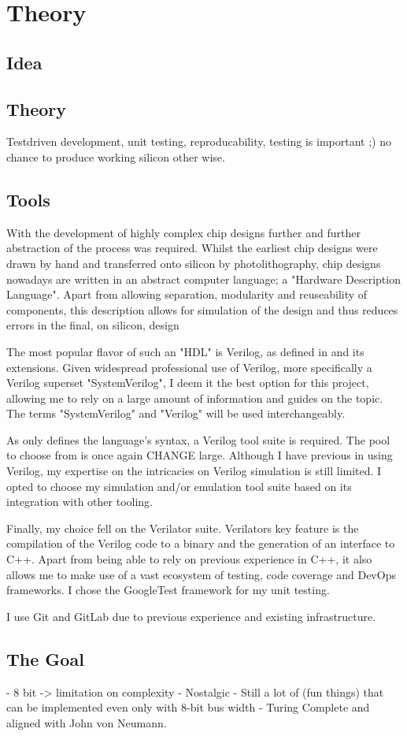 

\chapter{Theory}

\section{Idea}

\section{Theory}

Testdriven development, unit testing, reproducability, testing is important ;) no chance to produce working silicon other wise.

\section{Tools}
With the development of highly complex chip designs further and further abstraction of the process was required. Whilst the earliest chip designs were drawn by hand and transferred onto silicon by photolithography, chip designs nowadays are written in an abstract computer language; a "Hardware Description Language". Apart from allowing separation, modularity and reuseability of components, this description allows for simulation of the design and thus reduces errors in the final, on silicon, design 

The most popular flavor of such an "HDL" is Verilog, as defined in \cite{10458102} and its extensions. Given widespread professional use of Verilog, more specifically a Verilog superset "SystemVerilog", I deem it the best option for this project, allowing me to rely on a large amount of information and guides on the topic. The terms "SystemVerilog" and "Verilog" will be used interchangeably. 

As \cite{10458102} only defines the language's syntax, a Verilog tool suite is required. The pool to choose from is once again CHANGE large. Although I have previous in using Verilog, my expertise on the intricacies on Verilog simulation is still limited. I opted to choose my simulation and/or emulation tool suite based on its integration with other tooling.

Finally, my choice fell on the Verilator suite. Verilators key feature is the compilation of the Verilog code to a binary and the 
generation of an interface to C++. Apart from being able to rely on previous experience in C++, it also allows me to make use of a vast ecosystem of testing, code coverage and DevOps frameworks. I chose the GoogleTest framework for my unit testing. 

I use Git and GitLab due to previous experience and existing infrastructure. 

  \section{The Goal}

- 8 bit -> limitation on complexity
- Nostalgic
- Still a lot of (fun things) that can be implemented even only with 8-bit bus width
- Turing Complete and aligned with John von Neumann.




